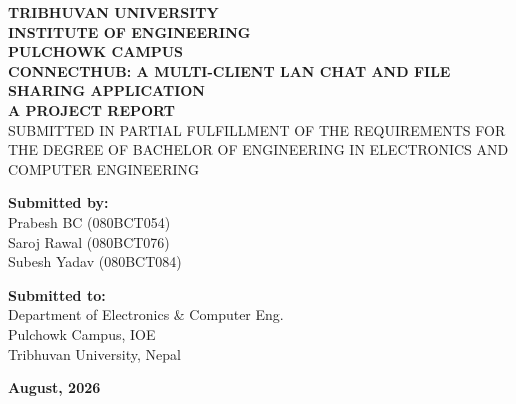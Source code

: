 \documentclass[12pt,a4paper]{report}
\begin{document}
\begin{titlepage}
\begin{center}
    {\Large \textbf{TRIBHUVAN UNIVERSITY}}\\[0.3cm]
    {\Large \textbf{INSTITUTE OF ENGINEERING}}\\[0.3cm]
    {\Large \textbf{PULCHOWK CAMPUS}}\\[1.5cm]

    {\huge \textbf{CONNECTHUB: A MULTI-CLIENT LAN CHAT AND FILE SHARING APPLICATION}}\\[1.5cm]

    {\large \textbf{A PROJECT REPORT}}\\[0.3cm]
    {\large SUBMITTED IN PARTIAL FULFILLMENT OF THE REQUIREMENTS FOR THE DEGREE OF BACHELOR OF ENGINEERING IN ELECTRONICS AND COMPUTER ENGINEERING}\\[2.0cm]

    \begin{minipage}{0.48\textwidth}
        \begin{left}
            \textbf{Submitted by:}\\[0.2cm]
            Prabesh BC (080BCT054)\\
            Saroj Rawal (080BCT076)\\
            Subesh Yadav (080BCT084)
        \end{left}
    \end{minipage}
    \hfill
    \begin{minipage}{0.48\textwidth}
        \begin{right}
            \textbf{Submitted to:}\\[0.2cm]
            Department of Electronics \& Computer Eng.\\
            Pulchowk Campus, IOE\\
            Tribhuvan University, Nepal
        \end{right}
    \end{minipage}

    \vfill

    {\large \textbf{August, 2026}}
\end{center}
\end{titlepage}

\setcounter{page}{1}
\end{document}
